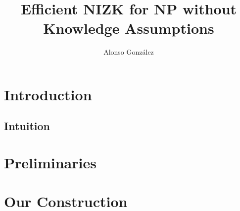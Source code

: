 \documentclass{llncs}
\author{Alonso Gonz\'alez \inst{1}}
\institute{Mi casita}
\title{Efficient NIZK for NP without Knowledge Assumptions}
\begin{document}

\maketitle
\begin{abstract}
    
\end{abstract} 

\section{Introduction}

    
        
    \subsection{Intuition} \label{sec:intuition}
    
    	

        
\section{Preliminaries}


\section{Our Construction}
    
	



\end{document}
